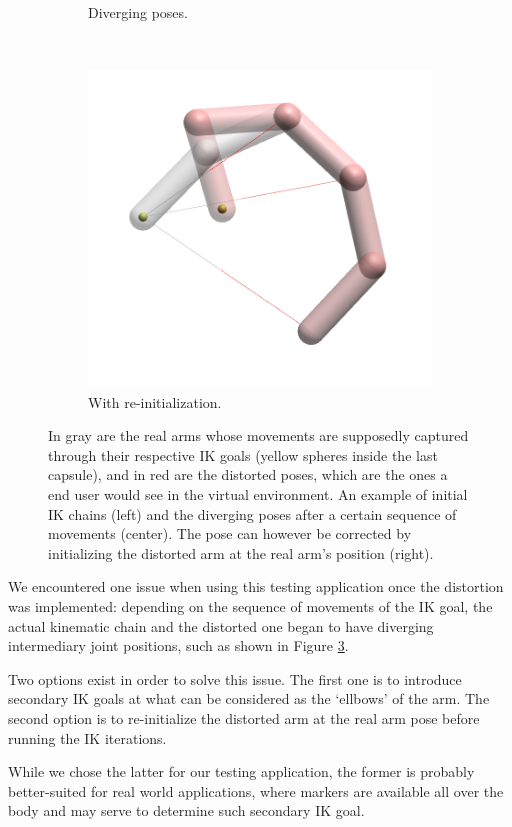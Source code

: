 \begin{figure}[h]
\begin{subfigure}[b]{0.3\textwidth}
        \caption{Diverging poses.}
        \label{subfig:divergence}
    \end{subfigure}
    ~
    \begin{subfigure}[b]{0.28\textwidth}
        \includegraphics[width=\textwidth]{Figures/arm_initDivergence.png}
        \caption{With re-initialization.}
        \label{subfig:initDivergence}
    \end{subfigure}
    \caption{In gray are the real arms whose movements are supposedly captured through their respective IK goals (yellow spheres inside the last capsule), and in red are the distorted poses, which are the ones a end user would see in the virtual environment. An example of initial IK chains (left) and the diverging poses after a certain sequence of movements (center). The pose can however be corrected by initializing the distorted arm at the real arm's position (right).}
    \label{fig:divergence}
\end{figure}

We encountered one issue when using this testing application once the distortion was implemented: depending on the sequence of movements of the IK goal, the actual kinematic chain and the distorted one began to have diverging intermediary joint positions, such as shown in Figure \ref{fig:divergence}.

Two options exist in order to solve this issue. The first one is to introduce secondary IK goals at what can be considered as the `ellbows' of the arm. The second option is to re-initialize the distorted arm at the real arm pose before running the IK iterations.

While we chose the latter for our testing application, the former is probably better-suited for real world applications, where markers are available all over the body and may serve to determine such secondary IK goal.
